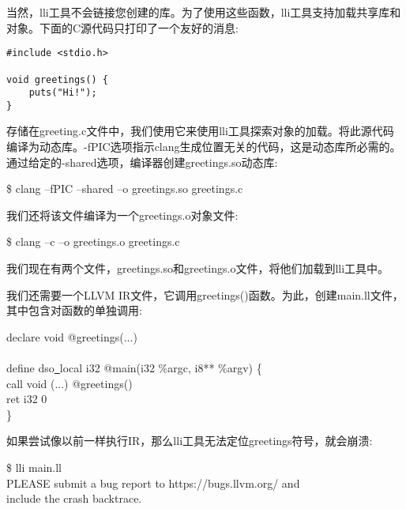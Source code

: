 当然，lli工具不会链接您创建的库。为了使用这些函数，lli工具支持加载共享库和对象。下面的C源代码只打印了一个友好的消息:\par

\begin{lstlisting}[caption={}]
#include <stdio.h>

void greetings() {
	puts("Hi!");
}
\end{lstlisting}

存储在greeting.c文件中，我们使用它来使用lli工具探索对象的加载。将此源代码编译为动态库。-fPIC选项指示clang生成位置无关的代码，这是动态库所必需的。通过给定的-shared选项，编译器创建greetings.so动态库:\par

\begin{tcolorbox}[colback=white,colframe=black]
\$ clang –fPIC –shared –o greetings.so greetings.c
\end{tcolorbox}

我们还将该文件编译为一个greetings.o对象文件:\par

\begin{tcolorbox}[colback=white,colframe=black]
\$ clang –c –o greetings.o greetings.c
\end{tcolorbox}

我们现在有两个文件，greetings.so和greetings.o文件，将他们加载到lli工具中。\par

我们还需要一个LLVM IR文件，它调用greetings()函数。为此，创建main.ll文件，其中包含对函数的单独调用:\par

\begin{tcolorbox}[colback=white,colframe=black]
declare void @greetings(...) \\
\\
define dso\underline{~}local i32 @main(i32 \%argc, i8** \%argv) \{ \\
\hspace*{0.5cm}call void (...) @greetings() \\
\hspace*{0.5cm}ret i32 0 \\
\}
\end{tcolorbox}

如果尝试像以前一样执行IR，那么lli工具无法定位greetings符号，就会崩溃:\par

\begin{tcolorbox}[colback=white,colframe=black]
\$ lli main.ll \\
PLEASE submit a bug report to https://bugs.llvm.org/ and \\
include the crash backtrace.
\end{tcolorbox}

